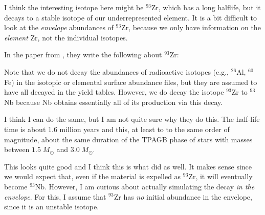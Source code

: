 \documentclass[a4paper,10pt]{article}
\begin{document}
\begin{minipage}{1.55\textwidth}
\end{minipage}

I think the interesting isotope here might be \(^{93}\text{Zr} \), which has a long halflife, but it decays to a stable isotope of our underrepresented element.
It is a bit difficult to look at the \emph{envelope} abundances of \(^{93}\text{Zr}\), because we only have information on the \emph{element} Zr, not the individual
isotopes.

In the paper from \citet{karakas2016}, they write the following about \(^{93}\text{Zr}\):
\begin{shadequote}{\citet{karakas2016}}
Note that we do not decay
the abundances of radioactive isotopes (e.g.,  \(^{26}\)Al, \(^{60}\)Fe)
in the isotopic or elemental surface abundance files, but
they are assumed to have all decayed in the yield tables.
However, we do decay the isotope \(^{93}\)Zr to \(^{93}\)Nb because
Nb obtains essentially all of its production via this decay.
\end{shadequote}

I think I can do the same, but I am not quite sure why they do this. The half-life time
is about 1.6 million years and this, at least to to the same order of magnitude, about the same
duration of the TPAGB phase of stars with masses between \(1.5\; M_\odot \) and \(3.0\; M_\odot \).

\begin{figure}[ht]
    \centering
\end{figure}

\begin{figure}[ht]
    \centering
\end{figure}
This looks quite good and I think this is what \citet{karakas2016} did as well. It makes sense since we would
expect that, even if the material is expelled as \(^{93}\text{Zr}\), it will eventually become
 \(^{93}\text{Nb}  \). However, I am curious about
actually simulating the decay
\emph{in the envelope}. For this, I assume that
\(^{93}\text{Zr}\) has \emph{no} initial abundance in the envelope, since it is an unstable isotope.

\nextpage
\begin{figure}[ht]
    \centering
\end{figure}
\end{document}
